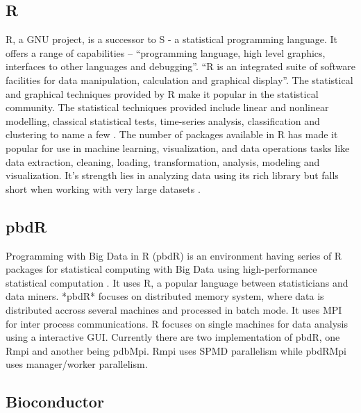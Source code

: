    \pv

\subsection{R}

    R, a GNU project, is a successor to S - a statistical programming
    language. It offers a range of capabilities – ``programming
    language, high level graphics, interfaces to other languages and
    debugging''. ``R is an integrated suite of software facilities for
    data manipulation, calculation and graphical display''. The
    statistical and graphical techniques provided by R make it popular
    in the statistical community. The statistical techniques provided
    include linear and nonlinear modelling, classical statistical
    tests, time-series analysis, classification and clustering to name
    a few \cite{www-R}. The number of packages available in R has
    made it popular for use in machine learning, visualization, and
    data operations tasks like data extraction, cleaning, loading,
    transformation, analysis, modeling and visualization. It's
    strength lies in analyzing data using its rich library but falls
    short when working with very large datasets \cite{book-R}.
    
\subsection{pbdR}

    Programming with Big Data in R (pbdR) is an
    environment having series of R packages for statistical computing
    with Big Data using high-performance
    statistical computation \cite{www-pbdR}. It
    uses R, a popular language between statisticians and data
    miners. *pbdR* focuses on distributed memory system, where data is
    distributed accross several machines and processed in batch
    mode. It uses MPI for inter process communications. R focuses on
    single machines for data analysis using a interactive
    GUI. Currently there are two implementation of pbdR, one Rmpi and
    another being pdbMpi.  Rmpi uses SPMD parallelism while pbdRMpi
    uses manager/worker parallelism.

    \pv

\subsection{Bioconductor \cv}

